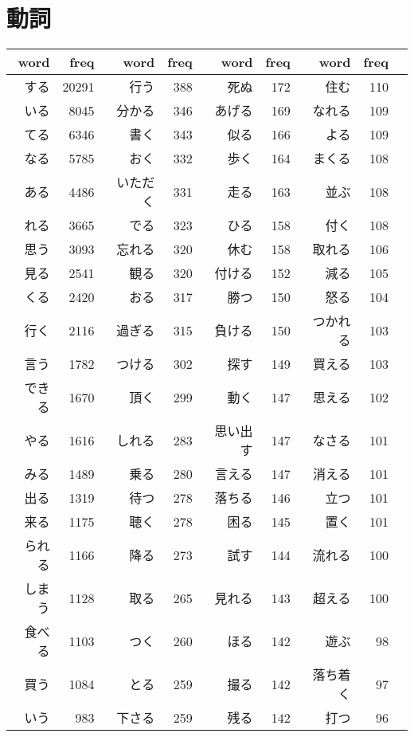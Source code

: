 \section{動詞}
\begin{longtable}{rrrrrrrrr}
\hline
word & freq & word & freq & word & freq & word & freq \\
\hline\endhead\hline\endfoot
する & 20291 & 行う & 388 & 死ぬ & 172 & 住む & 110 \\
いる & 8045 & 分かる & 346 & あげる & 169 & なれる & 109 \\
てる & 6346 & 書く & 343 & 似る & 166 & よる & 109 \\
なる & 5785 & おく & 332 & 歩く & 164 & まくる & 108 \\
ある & 4486 & いただく & 331 & 走る & 163 & 並ぶ & 108 \\
れる & 3665 & でる & 323 & ひる & 158 & 付く & 108 \\
思う & 3093 & 忘れる & 320 & 休む & 158 & 取れる & 106 \\
見る & 2541 & 観る & 320 & 付ける & 152 & 減る & 105 \\
くる & 2420 & おる & 317 & 勝つ & 150 & 怒る & 104 \\
行く & 2116 & 過ぎる & 315 & 負ける & 150 & つかれる & 103 \\
言う & 1782 & つける & 302 & 探す & 149 & 買える & 103 \\
できる & 1670 & 頂く & 299 & 動く & 147 & 思える & 102 \\
やる & 1616 & しれる & 283 & 思い出す & 147 & なさる & 101 \\
みる & 1489 & 乗る & 280 & 言える & 147 & 消える & 101 \\
出る & 1319 & 待つ & 278 & 落ちる & 146 & 立つ & 101 \\
来る & 1175 & 聴く & 278 & 困る & 145 & 置く & 101 \\
られる & 1166 & 降る & 273 & 試す & 144 & 流れる & 100 \\
しまう & 1128 & 取る & 265 & 見れる & 143 & 超える & 100 \\
食べる & 1103 & つく & 260 & ほる & 142 & 遊ぶ & 98 \\
買う & 1084 & とる & 259 & 撮る & 142 & 落ち着く & 97 \\
いう & 983 & 下さる & 259 & 残る & 142 & 打つ & 96 \\

\end{longtable}
